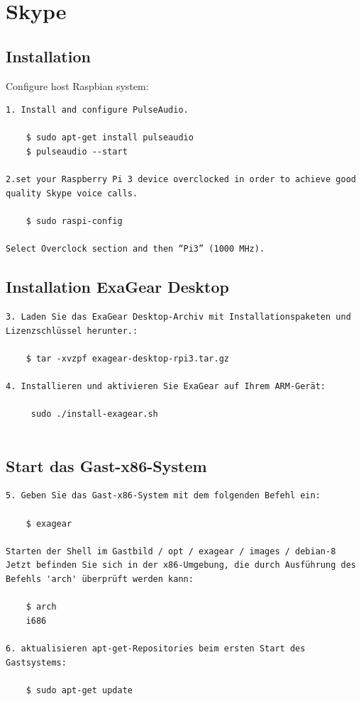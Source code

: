 \section{Skype}

\subsection{Installation}
Configure host Raspbian system:
\begin{verbatim}
1. Install and configure PulseAudio.

	$ sudo apt-get install pulseaudio
	$ pulseaudio --start

2.set your Raspberry Pi 3 device overclocked in order to achieve good quality Skype voice calls. 

	$ sudo raspi-config

Select Overclock section and then “Pi3” (1000 MHz).

\end{verbatim}

\subsection{Installation ExaGear Desktop}
\begin{verbatim}
3. Laden Sie das ExaGear Desktop-Archiv mit Installationspaketen und Lizenzschlüssel herunter.:

	$ tar -xvzpf exagear-desktop-rpi3.tar.gz
	
4. Installieren und aktivieren Sie ExaGear auf Ihrem ARM-Gerät:

	 sudo ./install-exagear.sh
	 
\end{verbatim}
\subsection{Start das Gast-x86-System}
\begin{verbatim}
5. Geben Sie das Gast-x86-System mit dem folgenden Befehl ein:

	$ exagear
	
Starten der Shell im Gastbild / opt / exagear / images / debian-8
Jetzt befinden Sie sich in der x86-Umgebung, die durch Ausführung des Befehls 'arch' überprüft werden kann:

	$ arch
	i686
	
6. aktualisieren apt-get-Repositories beim ersten Start des Gastsystems:

	$ sudo apt-get update
	
\end{verbatim}
